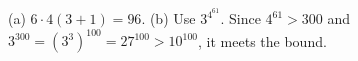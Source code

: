 (a) $\boxed{6\cdot4(3+1)=96}$. (b) Use $\boxed{3^{4^{61}}}$. Since $4^{61}>300$ and $3^{300}=(3^3)^{100}=27^{100}>10^{100}$, it meets the bound.
